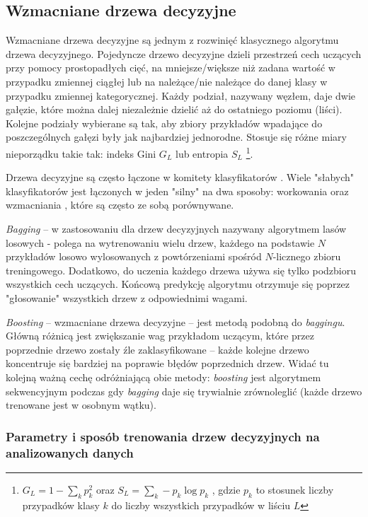 \subsection{Wzmacniane drzewa decyzyjne}
\label{subsec:drzewa}

Wzmacniane drzewa decyzyjne są jednym z rozwinięć klasycznego algorytmu drzewa decyzyjnego. 
Pojedyncze drzewo decyzyjne dzieli przestrzeń cech uczących przy pomocy prostopadłych cięć, na mniejsze/większe niż zadana wartość w przypadku zmiennej ciągłej lub na należące/nie należące do danej klasy w przypadku zmiennej kategorycznej. Każdy podział, nazywany węzłem, daje dwie gałęzie, które można dalej niezależnie dzielić aż do ostatniego poziomu (liści). Kolejne podziały wybierane są tak, aby zbiory przykładów wpadające do poszczególnych gałęzi były jak najbardziej jednorodne. Stosuje się różne miary nieporządku takie tak: indeks Gini $G_L$ lub entropia $S_L$ \footnote{$G_L = 1 - \sum\limits_k p_k^2$ oraz $S_L = \sum\limits_k -p_k \log p_k$ , gdzie $p_k$ to stosunek liczby przypadków klasy $k$ do liczby wszystkich przypadków w liściu $L$}.

Drzewa decyzyjne są często łączone w komitety klasyfikatorów . Wiele "słabych" klasyfikatorów jest łączonych w jeden "silny" na dwa sposoby: workowania  oraz wzmacniania , które są często ze sobą porównywane.

\textit{Bagging} -- w zastosowaniu dla drzew decyzyjnych nazywany algorytmem lasów losowych  - polega na wytrenowaniu wielu drzew, każdego na podstawie $N$ przykładów losowo wylosowanych z powtórzeniami spośród $N$-licznego zbioru treningowego. Dodatkowo, do uczenia każdego drzewa używa się tylko podzbioru wszystkich cech uczących. Końcową predykcję algorytmu otrzymuje się poprzez "głosowanie" wszystkich drzew z odpowiednimi wagami.

\textit{Boosting} -- wzmacniane drzewa decyzyjne  -- jest metodą podobną do \textit{baggingu}. Główną różnicą jest zwiększanie wag przykładom uczącym, które przez poprzednie drzewo zostały źle zaklasyfikowane -- każde kolejne drzewo koncentruje się bardziej na poprawie błędów poprzednich drzew. Widać tu kolejną ważną cechę odróżniającą obie metody: \textit{boosting} jest algorytmem sekwencyjnym podczas gdy \textit{bagging} daje się trywialnie zrównoleglić (każde drzewo trenowane jest w osobnym wątku).



\subsubsection*{Parametry i sposób trenowania drzew decyzyjnych na analizowanych danych}

